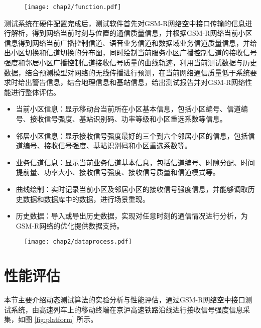 \begin{figure}[!htp]
\centering
    \texttt{[image: chap2/function.pdf]}
\end{figure}

测试系统在硬件配置完成后，测试软件首先对GSM-R网络空中接口传输的信息进行解析，得到网络当前时刻与位置的通信质量信息，并根据GSM-R网络当前小区信息得到网络当前广播控制信道、语音业务信道和数据域业务信道质量信息，并给出小区切换和信道切换的分布图，同时绘制当前服务小区广播控制信道的接收信号强度和邻居小区广播控制信道接收信号质量的曲线轨迹，利用当前测试数据与历史数据，结合预测模型对网络的无线传播进行预测，在当前网络通信质量低于系统要求时给出警告信息，结合地理信息和基站信息，给出测试报告并对GSM-R网络性能进行整体评估。
\begin{itemize}
  \item 当前小区信息：显示移动台当前所在小区基本信息，包括小区编号、信道编号、接收信号强度、基站识别码、功率等级和小区重选系数等信息。
  \item 邻居小区信息：显示接收信号强度最好的三个到六个邻居小区的信息，包括信道编号、接收信号强度、基站识别码和小区重选系数等。
  \item 业务信道信息：显示当前业务信道基本信息，包括信道编号、时隙分配、时间提前量、功率大小、接收信号强度、接收信号质量和信道模式等。
  \item 曲线绘制：实时记录当前小区及邻居小区的接收信号强度信息，并能够调取历史数据和数据库中的数据，进行场景重现。
  \item 历史数据：导入或导出历史数据，实现对任意时刻的通信情况进行分析，为GSM-R网络的优化提供数据支持。
\end{itemize}

\begin{figure}[!htp]
\centering
    \texttt{[image: chap2/dataprocess.pdf]}
\end{figure}


\section{性能评估}
\label{chap:evaluation_phy}

本节主要介绍动态测试算法的实验分析与性能评估，通过GSM-R网络空中接口测试系统，由高速列车上的移动终端在京沪高速铁路沿线进行接收信号强度信息采集，如图 \ref{fig:platform} 所示。

